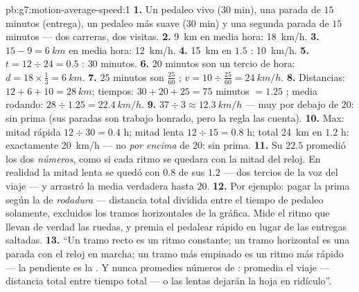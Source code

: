 \begin{solution}{pb:g7:motion-average-speed:1}
\textbf{1.} Un pedaleo vivo ($30$ min), una parada de $15$ minutos
(entrega), un pedaleo más suave ($30$ min) y una segunda parada de
$15$ minutos --- dos carreras, dos visitas.
\textbf{2.} \qty{9}{km} en media hora: \qty{18}{km/h}.
\textbf{3.} $15 - 9 = \qty{6}{km}$ en media hora: \qty{12}{km/h}.
\textbf{4.} \qty{15}{km} en $1.5$ : \qty{10}{km/h}.
\textbf{5.} $t = 12 \div 24 = 0.5$ : $30$ minutos.
\textbf{6.} $20$ minutos son un tercio de hora: $d = 18 \times
\tfrac{1}{3} = \qty{6}{km}$.
\textbf{7.} $25$ minutos son $\tfrac{25}{60}$ ; $v = 10 \div
\tfrac{25}{60} = \qty{24}{km/h}$.
\textbf{8.} Distancias: $12 + 6 + 10 = \qty{28}{km}$; tiempos: $30 +
20 + 25 = 75$ minutos $= 1.25$ ; media rodando: $28 \div 1.25
= \qty{22.4}{km/h}$.
\textbf{9.} $37 \div 3 \approx \qty{12.3}{km/h}$ --- muy por debajo de
$20$: sin prima (sus paradas son trabajo honrado, pero la regla las
cuenta).
\textbf{10.} Max: mitad rápida $12 \div 30 = 0.4$ h; mitad lenta $12
\div 15 = 0.8$ h; total \qty{24}{km} en $1.2$ h: exactamente
\qty{20}{km/h} --- no \emph{por encima} de $20$: sin prima.
\textbf{11.} Su $22.5$ promedió los dos \emph{números}, como si cada
ritmo se quedara con la mitad del reloj. En realidad la mitad lenta se
quedó con $0.8$ de sus $1.2$  --- dos tercios de la voz del
viaje --- y arrastró la media verdadera hasta $20$.
\textbf{12.} Por ejemplo: pagar la prima según la  de
\emph{rodadura} --- distancia total dividida entre el tiempo de
pedaleo solamente, excluidos los tramos horizontales de la gráfica.
Mide el ritmo que llevan de verdad las ruedas, y premia el pedalear
rápido en lugar de las entregas saltadas.
\textbf{13.} ``Un tramo recto es un ritmo constante; un tramo
horizontal es una parada con el reloj en marcha; un tramo más empinado
es un ritmo más rápido --- la pendiente es la . Y nunca
promedies números de : promedia el viaje --- distancia total
entre tiempo total --- o las  lentas dejarán la hoja en
ridículo''.
\end{solution}
